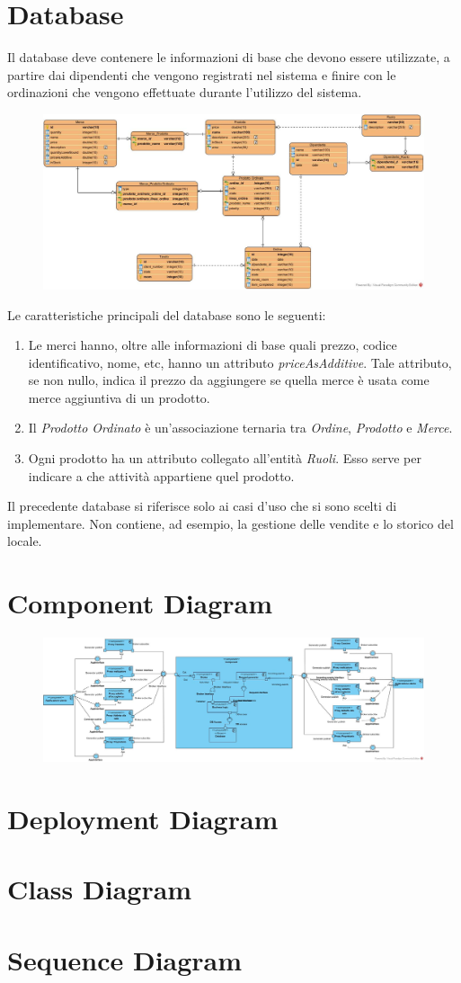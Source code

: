\section{Database}
Il database deve contenere le informazioni di base che devono essere utilizzate, a partire dai dipendenti che vengono registrati nel sistema e finire con le ordinazioni che vengono effettuate durante l'utilizzo del sistema.
\begin{figure}[H]
	\centering
	\includegraphics[width=1\textwidth]{Immagini/database.jpg}
\end{figure}
Le caratteristiche principali del database sono le seguenti:
\begin{enumerate}
	\item Le merci hanno, oltre alle informazioni di base quali prezzo, codice identificativo, nome, etc, hanno un attributo \textit{priceAsAdditive}. Tale attributo, se non nullo, indica il prezzo da aggiungere se quella merce è usata come merce aggiuntiva di un prodotto.
	\item Il \textit{Prodotto Ordinato} è un'associazione ternaria tra \textit{Ordine}, \textit{Prodotto} e \textit{Merce}.
	 \item Ogni prodotto ha un attributo collegato all'entità \textit{Ruoli}. Esso serve per indicare a che attività appartiene quel prodotto.
\end{enumerate}
Il precedente database si riferisce solo ai casi d'uso che si sono scelti di implementare. Non contiene, ad esempio, la gestione delle vendite e lo storico del locale.

\section{Component Diagram}
\begin{figure}[H]
	\centering
	\includegraphics[width=1\textwidth]{Immagini/dynamic components.jpg}
\end{figure}
\section{Deployment Diagram}
\section{Class Diagram}
\section{Sequence Diagram}